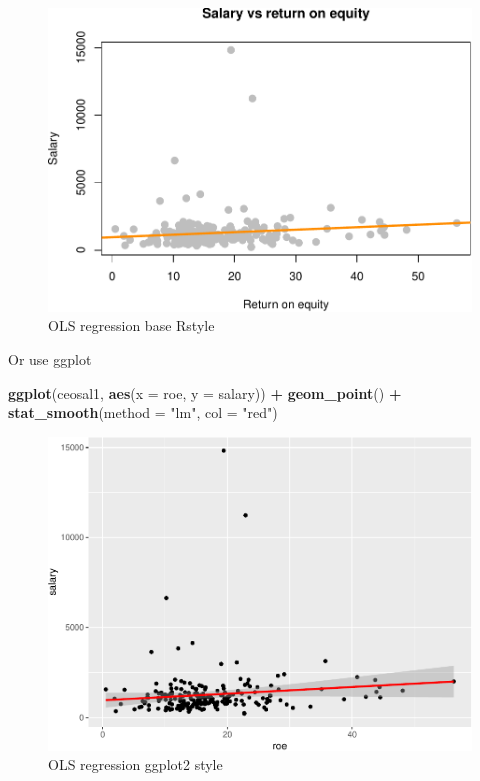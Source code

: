 \documentclass[]{book}
\newenvironment{Shaded}{\begin{snugshade}}{\end{snugshade}}
\newcommand{\DataTypeTok}[1]{\textcolor[rgb]{0.13,0.29,0.53}{#1}}
\newcommand{\KeywordTok}[1]{\textcolor[rgb]{0.13,0.29,0.53}{\textbf{#1}}}
\newcommand{\NormalTok}[1]{#1}
\newcommand{\OperatorTok}[1]{\textcolor[rgb]{0.81,0.36,0.00}{\textbf{#1}}}
\newcommand{\StringTok}[1]{\textcolor[rgb]{0.31,0.60,0.02}{#1}}
\begin{document}
\begin{figure}

{\centering \includegraphics[width=0.8\linewidth]{MEM5220_R_files/figure-latex/fig1-1} 

}

\caption{OLS regression base Rstyle}\label{fig:fig1}
\end{figure}

Or use ggplot

\begin{Shaded}
\begin{Highlighting}[]
\KeywordTok{ggplot}\NormalTok{(ceosal1, }\KeywordTok{aes}\NormalTok{(}\DataTypeTok{x =}\NormalTok{ roe, }\DataTypeTok{y =}\NormalTok{ salary)) }\OperatorTok{+}\StringTok{ }
\StringTok{  }\KeywordTok{geom_point}\NormalTok{() }\OperatorTok{+}
\StringTok{  }\KeywordTok{stat_smooth}\NormalTok{(}\DataTypeTok{method =} \StringTok{"lm"}\NormalTok{, }\DataTypeTok{col =} \StringTok{"red"}\NormalTok{)}
\end{Highlighting}
\end{Shaded}

\begin{figure}

{\centering \includegraphics[width=0.8\linewidth]{MEM5220_R_files/figure-latex/fig2-1} 

}

\caption{OLS regression ggplot2 style}\label{fig:fig2}
\end{figure}
\end{document}
